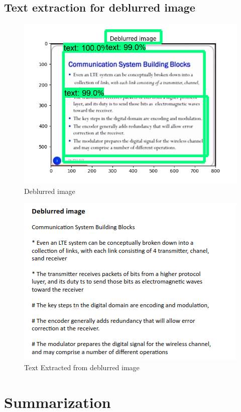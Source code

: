 \subsection{Text extraction for deblurred image}
\begin{figure}[H]
\centering
	\includegraphics[scale=0.7]{Figures/myplot_deblur.png}	
	\caption{Deblurred image}
	\label{fig:deblur}
\end{figure}
\begin{figure}[H]
\centering
	\includegraphics[scale=0.7]{Figures/deblur_op.png}	
	\caption{Text Extracted from deblurred image}
	\label{fig:deblur_op}
\end{figure}
\newpage
\section{Summarization}

